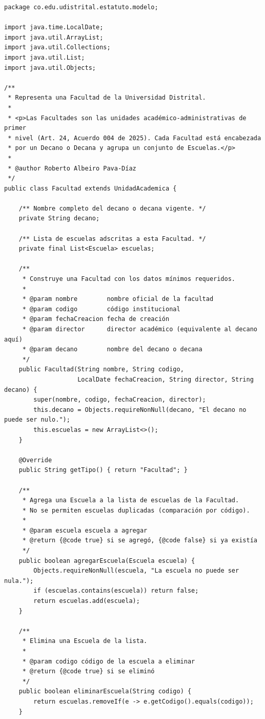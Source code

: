 \begin{lstlisting}[style=javaStyle, caption={Clase \texttt{Facultad}}, label={lst:facultad}]
package co.edu.udistrital.estatuto.modelo;

import java.time.LocalDate;
import java.util.ArrayList;
import java.util.Collections;
import java.util.List;
import java.util.Objects;

/**
 * Representa una Facultad de la Universidad Distrital.
 *
 * <p>Las Facultades son las unidades académico-administrativas de primer
 * nivel (Art. 24, Acuerdo 004 de 2025). Cada Facultad está encabezada
 * por un Decano o Decana y agrupa un conjunto de Escuelas.</p>
 *
 * @author Roberto Albeiro Pava-Díaz
 */
public class Facultad extends UnidadAcademica {

    /** Nombre completo del decano o decana vigente. */
    private String decano;

    /** Lista de escuelas adscritas a esta Facultad. */
    private final List<Escuela> escuelas;

    /**
     * Construye una Facultad con los datos mínimos requeridos.
     *
     * @param nombre        nombre oficial de la facultad
     * @param codigo        código institucional
     * @param fechaCreacion fecha de creación
     * @param director      director académico (equivalente al decano aquí)
     * @param decano        nombre del decano o decana
     */
    public Facultad(String nombre, String codigo,
                    LocalDate fechaCreacion, String director, String decano) {
        super(nombre, codigo, fechaCreacion, director);
        this.decano = Objects.requireNonNull(decano, "El decano no puede ser nulo.");
        this.escuelas = new ArrayList<>();
    }

    @Override
    public String getTipo() { return "Facultad"; }

    /**
     * Agrega una Escuela a la lista de escuelas de la Facultad.
     * No se permiten escuelas duplicadas (comparación por código).
     *
     * @param escuela escuela a agregar
     * @return {@code true} si se agregó, {@code false} si ya existía
     */
    public boolean agregarEscuela(Escuela escuela) {
        Objects.requireNonNull(escuela, "La escuela no puede ser nula.");
        if (escuelas.contains(escuela)) return false;
        return escuelas.add(escuela);
    }

    /**
     * Elimina una Escuela de la lista.
     *
     * @param codigo código de la escuela a eliminar
     * @return {@code true} si se eliminó
     */
    public boolean eliminarEscuela(String codigo) {
        return escuelas.removeIf(e -> e.getCodigo().equals(codigo));
    }


\end{lstlisting}
